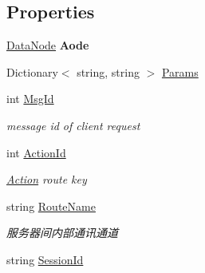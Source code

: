 \subsection*{Properties}
\begin{DoxyCompactItemize}
\item 
\mbox{\label{class_t_net_1_1_contract_1_1_request_package_a0e0297bb4b64ae84351f188ced2ae263}} 
\mbox{\hyperlink{class_t_net_1_1_data_node}{Data\+Node}} {\bfseries Aode}
\item 
Dictionary$<$ string, string $>$ \mbox{\hyperlink{class_t_net_1_1_contract_1_1_request_package_a8bd0af2a192de3cee042d0a3ef40d8c0}{Params}}
\item 
int \mbox{\hyperlink{class_t_net_1_1_contract_1_1_request_package_a456a7bcd8ddabe32247e33f9055bf2a3}{Msg\+Id}}
\begin{DoxyCompactList}\small\item\em message id of client request \end{DoxyCompactList}\item 
int \mbox{\hyperlink{class_t_net_1_1_contract_1_1_request_package_a5a8096016d290fc98fac2ebe81b7405d}{Action\+Id}}
\begin{DoxyCompactList}\small\item\em \mbox{\hyperlink{namespace_t_net_1_1_contract_1_1_action}{Action}} route key \end{DoxyCompactList}\item 
string \mbox{\hyperlink{class_t_net_1_1_contract_1_1_request_package_abc38ac4f3452921aeb54e67b28eea1bd}{Route\+Name}}
\begin{DoxyCompactList}\small\item\em 服务器间内部通讯通道 \end{DoxyCompactList}\item 
string \mbox{\hyperlink{class_t_net_1_1_contract_1_1_request_package_a9338376f0861bb91a45d35b60280032f}{Session\+Id}}

\end{DoxyCompactItemize}
